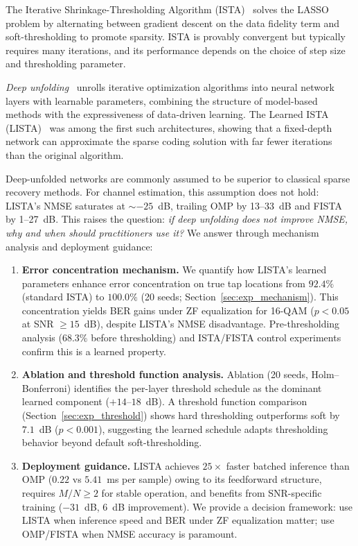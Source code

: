 \documentclass[a4paper,fleqn]{cas-sc}
\begin{document}
The Iterative Shrinkage-Thresholding Algorithm (ISTA)~\citep{daubechies2004iterative, beck2009fast} solves the LASSO problem by alternating between gradient descent on the data fidelity term and soft-thresholding to promote sparsity. ISTA is provably convergent but typically requires many iterations, and its performance depends on the choice of step size and thresholding parameter.

\emph{Deep unfolding}~\citep{gregor2010learning, monga2021algorithm} unrolls iterative optimization algorithms into neural network layers with learnable parameters, combining the structure of model-based methods with the expressiveness of data-driven learning. The Learned ISTA (LISTA)~\citep{gregor2010learning} was among the first such architectures, showing that a fixed-depth network can approximate the sparse coding solution with far fewer iterations than the original algorithm.

Deep-unfolded networks are commonly assumed to be superior to classical sparse recovery methods. For channel estimation, this assumption does not hold: LISTA's NMSE saturates at $\sim$$-25$~dB, trailing OMP by 13--33~dB and FISTA by 1--27~dB. This raises the question: \emph{if deep unfolding does not improve NMSE, why and when should practitioners use it?} We answer through mechanism analysis and deployment guidance:

\begin{enumerate}
\item \textbf{Error concentration mechanism.} We quantify how LISTA's learned parameters enhance error concentration on true tap locations from $92.4\%$ (standard ISTA) to $100.0\%$ (20 seeds; Section~\ref{sec:exp_mechanism}). This concentration yields BER gains under ZF equalization for 16-QAM ($p < 0.05$ at SNR $\geq 15$~dB), despite LISTA's NMSE disadvantage. Pre-thresholding analysis ($68.3\%$ before thresholding) and ISTA/FISTA control experiments confirm this is a learned property.

\item \textbf{Ablation and threshold function analysis.} Ablation (20 seeds, Holm--Bonferroni) identifies the per-layer threshold schedule as the dominant learned component ($+14$--$18$~dB). A threshold function comparison (Section~\ref{sec:exp_threshold}) shows hard thresholding outperforms soft by $7.1$~dB ($p < 0.001$), suggesting the learned schedule adapts thresholding behavior beyond default soft-thresholding.

\item \textbf{Deployment guidance.} LISTA achieves $25\times$ faster batched inference than OMP ($0.22$ vs $5.41$~ms per sample) owing to its feedforward structure, requires $M/N \geq 2$ for stable operation, and benefits from SNR-specific training ($-31$~dB, $6$~dB improvement). We provide a decision framework: use LISTA when inference speed and BER under ZF equalization matter; use OMP/FISTA when NMSE accuracy is paramount.
\end{enumerate}
\end{document}
